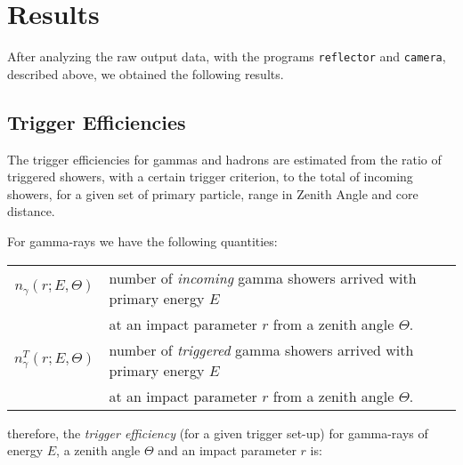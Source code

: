 \trigpattfig

\MORE%

\section{Results}

After analyzing the raw output data, with the programs
\texttt{reflector} and \texttt{camera}, described above, we obtained
the following results.

\subsection{Trigger Efficiencies}

The trigger efficiencies for gammas and hadrons are estimated from the
ratio of triggered showers, with a certain trigger criterion, to the
total of incoming showers, for a given set of primary particle, range
in Zenith Angle and core distance. 

For gamma-rays we have the following quantities:
%
\begin{center}
  \begin{tabular}{cl}
    $n_\gamma(r;E,\Theta)$ & number of \emph{incoming} 
    gamma showers arrived with primary energy $E$ \\
    & at an impact parameter $r$ from a zenith angle $\Theta$.\\
    $n_\gamma^T(r;E,\Theta)$ & number of \emph{triggered} 
    gamma showers arrived with primary energy $E$ \\
    & at an impact parameter $r$ from a zenith angle $\Theta$.\\
  \end{tabular}
\end{center}
%
therefore, the \emph{trigger efficiency} (for a given trigger set-up)
for gamma-rays of energy $E$, a zenith angle $\Theta$ and an impact
parameter $r$ is:
%
\effgammaeq


